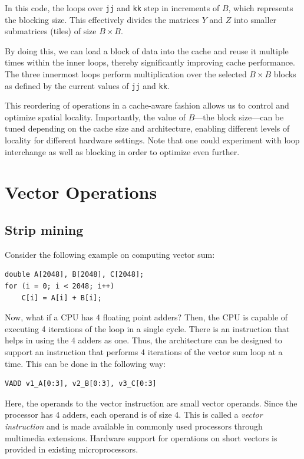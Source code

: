 \documentclass[12pt]{book}
\begin{document}
In this code, the loops over \texttt{jj} and \texttt{kk} step in increments of $B$, which represents the blocking size. This effectively divides the matrices $Y$ and $Z$ into smaller submatrices (tiles) of size $B \times B$. 

By doing this, we can load a block of data into the cache and reuse it multiple times within the inner loops, thereby significantly improving cache performance. The three innermost loops perform multiplication over the selected $B \times B$ blocks as defined by the current values of \texttt{jj} and \texttt{kk}. 

This reordering of operations in a cache-aware fashion allows us to control and optimize spatial locality. Importantly, the value of $B$—the block size—can be tuned depending on the cache size and architecture, enabling different levels of locality for different hardware settings. Note that one could experiment with loop interchange as well as blocking in order to optimize even further.

\section{Vector Operations}
\subsection{Strip mining}
Consider the following example on computing vector sum:
\begin{lstlisting}[style=cppstyle]
double A[2048], B[2048], C[2048];
for (i = 0; i < 2048; i++) 
    C[i] = A[i] + B[i];
\end{lstlisting}

Now, what if a CPU has 4 floating point adders? Then, the CPU is capable of executing 4 iterations of the loop in a single cycle. There is an instruction that helps in using the 4 adders as one. Thus, the architecture can be designed to support an instruction that performs 4 iterations of the vector sum loop at a time. This can be done in the following way:

\begin{lstlisting}[style=cppstyle]
VADD v1_A[0:3], v2_B[0:3], v3_C[0:3]
\end{lstlisting}

Here, the operands to the vector instruction are small vector operands. Since the processor has 4 adders, each operand is of size 4. This is called a \textit{vector instruction} and is made available in commonly used processors through multimedia extensions. Hardware support for operations on short vectors is provided in existing microprocessors.
\end{document}
